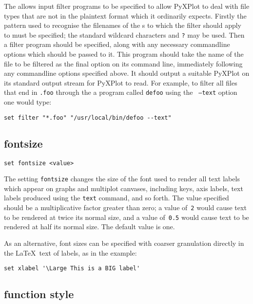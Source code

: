 The  allows input filter programs to be specified to allow
PyXPlot to deal with file types that are not in the plaintext format which it
ordinarily expects.  Firstly the pattern used to recognise the filenames of the
\datafile s to which the filter should apply to must be specified; the standard
wildcard characters {\tt *} and {\tt ?} may be used.  Then a filter program
should be specified, along with any necessary commandline options which should
be passed to it.  This program should take the name of the file to be filtered
as the final option on its command line, immediately following any commandline
options specified above.  It should output a suitable PyXPlot \datafile on its
standard output stream for PyXPlot to read.  For example, to filter all files
that end in {\tt .foo} through the a program called {\tt defoo} using the {\tt
--text} option one would type:

\begin{verbatim}
set filter "*.foo" "/usr/local/bin/defoo --text"
\end{verbatim}

\subsection{fontsize}

\begin{verbatim}
set fontsize <value>
\end{verbatim}

The setting {\tt fontsize} changes the size of the font used to render all text
labels which appear on graphs and multiplot canvases, including keys, axis
labels, text labels produced using the {\tt text} command, and so forth. The
value specified should be a multiplicative factor greater than zero; a value
of~{\tt 2} would cause text to be rendered at twice its normal size, and a
value of~{\tt 0.5} would cause text to be rendered at half its normal size.
The default value is one.

As an alternative, font sizes can be specified with coarser granulation
directly in the \LaTeX\ text of labels, as in the example:

\begin{verbatim}
set xlabel '\Large This is a BIG label'
\end{verbatim}


\subsection{function style}

